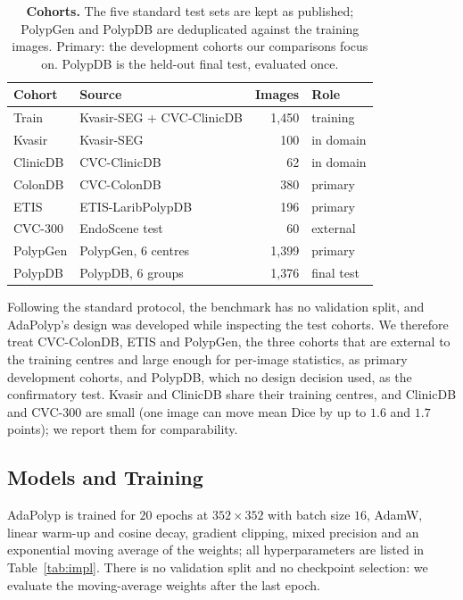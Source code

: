 \documentclass{ieeeaccess}
\begin{document}
\begin{table}[!t]
  \centering
  \caption{\textbf{Cohorts.} The five standard test sets are kept as published; PolypGen and PolypDB are deduplicated against the training images. Primary: the development cohorts our comparisons focus on. PolypDB is the held-out final test, evaluated once.}
  \label{tab:data}
  \vspace{2pt}
  \setlength{\tabcolsep}{3pt}\footnotesize
  \begin{tabular}{@{}l l r l@{}}
    \toprule
    \textbf{Cohort} & \textbf{Source} & \textbf{Images} & \textbf{Role} \\
    \midrule
    Train & Kvasir-SEG + CVC-ClinicDB & 1,450 & training \\
    Kvasir & Kvasir-SEG~\cite{jha2020kvasir} & 100 & in domain \\
    ClinicDB & CVC-ClinicDB & 62 & in domain \\
    ColonDB & CVC-ColonDB~\cite{tajbakhsh2015automated} & 380 & primary \\
    ETIS & ETIS-LaribPolypDB~\cite{silva2014toward} & 196 & primary \\
    CVC-300 & EndoScene test~\cite{fan2020pranet} & 60 & external \\
    PolypGen & PolypGen, 6 centres~\cite{ali2023polypgen} & 1,399 & primary \\
    PolypDB & PolypDB, 6 groups~\cite{jha2024polypdb} & 1,376 & final test \\
    \bottomrule
  \end{tabular}
\end{table}

Following the standard protocol, the benchmark has no validation split, and AdaPolyp's design was developed while inspecting the test cohorts. We therefore treat CVC-ColonDB, ETIS and PolypGen, the three cohorts that are external to the training centres and large enough for per-image statistics, as primary development cohorts, and PolypDB, which no design decision used, as the confirmatory test. Kvasir and ClinicDB share their training centres, and ClinicDB and CVC-300 are small (one image can move mean Dice by up to $1.6$ and $1.7$ points); we report them for comparability.

\subsection{Models and Training}
\label{sec:training}
AdaPolyp is trained for $20$ epochs at $352\times352$ with batch size $16$, AdamW, linear warm-up and cosine decay, gradient clipping, mixed precision and an exponential moving average of the weights; all hyperparameters are listed in Table~\ref{tab:impl}. There is no validation split and no checkpoint selection: we evaluate the moving-average weights after the last epoch.
\end{document}
